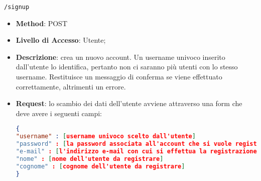 	\item \texttt{/signup}
		\begin{itemize}
			\item \textbf{Method}: POST
			\item \textbf{Livello di Accesso}: Utente;
			\item \textbf{Descrizione}: crea un nuovo account. Un username univoco inserito dall'utente lo identifica, pertanto non ci saranno più utenti con lo stesso username. Restituisce un messaggio di conferma se viene effettuato correttamente, altrimenti un errore.
			\item \textbf{Request}: lo scambio dei dati dell'utente avviene attraverso una form che deve avere i seguenti campi:
\begin{lstlisting}[language=json,firstnumber=1]
{
"username" : [username univoco scelto dall'utente]
"password" : [la password associata all'account che si vuole registrare]
"e-mail" : [l'indirizzo e-mail con cui si effettua la registrazione]
"nome" : [nome dell'utente da registrare]
"cognome" : [cognome dell'utente da registrare]
}
\end{lstlisting}
		\end{itemize}